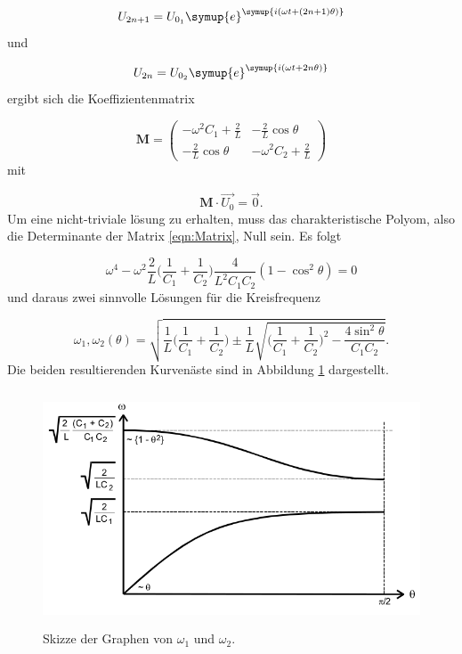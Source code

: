 \begin{equation}
  U_{2n+1} = U_{0_1} \symup{e}^{\symup{i(\omega t + (2n+1)\theta)}}
\end{equation}
und

\begin{equation}
  U_{2n} = U_{0_2} \symup{e}^{\symup{i(\omega t + 2n\theta)}}
\end{equation}
ergibt sich die Koeffizientenmatrix

\begin{equation}
  \symbf{M} =
  \begin{pmatrix}
    -\omega^2 C_1 + \frac{2}{L} & -\frac{2}{L} \cos \theta \\
    -\frac{2}{L} \cos \theta & -\omega^2 C_2 + \frac{2}{L}
  \end{pmatrix}
  \label{eqn:Matrix}
\end{equation}
mit

\begin{equation}
  \symbf{M} \cdot \vec{U_0} = \vec{0}.
\end{equation}
Um eine nicht-triviale lösung zu erhalten, muss das charakteristische Polyom,
also die Determinante der Matrix \eqref{eqn:Matrix}, Null sein.
Es folgt

\begin{equation}
  \omega^4 - \omega^2 \frac{2}{L} \biggl(\frac{1}{C_1} + \frac{1}{C_2}\biggr)
  \frac{4}{L^2 C_1 C_2} (1 - \cos^2 \theta) = 0
\end{equation}
und daraus zwei sinnvolle Lösungen für die Kreisfrequenz \omega

\begin{equation}
  \omega_1, \omega_2 (\theta) = \sqrt{\frac{1}{L} \biggl(\frac{1}{C_1} +
  \frac{1}{C_2}\biggr)
  \pm \frac{1}{L} \sqrt{\biggl(\frac{1}{C_1} + \frac{1}{C_2}\biggr)^2 -
  \frac{4 \sin^2 \theta}{C_1C_2}}}.
  \label{eqn:Omega}
\end{equation}
Die beiden resultierenden Kurvenäste sind in Abbildung \ref{fig:KurveLC1C2}
dargestellt.

\begin{figure}
  \centering
  \includegraphics[height=7cm]{KurveLC1C2.png}
  \caption{Skizze der Graphen von $\omega_1$ und $\omega_2$.}
  \label{fig:KurveLC1C2}
\end{figure}

